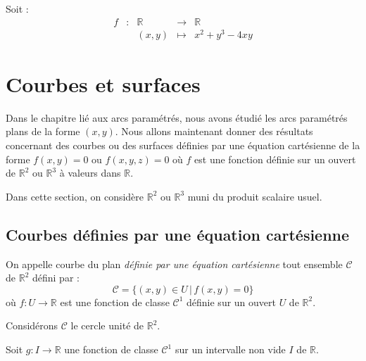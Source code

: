 \documentclass[a4paper,10pt]{report}
\begin{document}
\begin{ex} Soit :
$$\begin{array}{cccll}
f& : & \mathbb{R} & \rightarrow & \mathbb{R} \\
& & (x,y) & \mapsto & x^2+y^3-4xy 
\end{array}$$

\vspace{5cm}
\end{ex}

\section{Courbes et surfaces}
\noindent Dans le chapitre lié aux arcs paramétrés, nous avons étudié les arcs paramétrés plans de la forme $(x,y)$. Nous allons maintenant donner des résultats concernant des courbes ou des surfaces définies par une équation cartésienne de la forme $f(x,y)=0$ ou $f(x,y,z)=0$ où $f$ est une fonction définie sur un ouvert de $\mathbb{R}^2$ ou $\mathbb{R}^3$ à valeurs dans $\mathbb{R}$.

\medskip

\noindent Dans cette section, on considère $\mathbb{R}^2$ ou $\mathbb{R}^3$ muni du produit scalaire usuel.

\subsection{Courbes définies par une équation cartésienne}
\medskip

\noindent On appelle courbe du plan \textit{définie par une équation cartésienne} tout ensemble $\mathcal{C}$ de $\mathbb{R}^2$ défini par :
$$ \mathcal{C} = \lbrace (x,y) \in U \, \vert \, f(x,y)=0 \rbrace$$
où $f : U \rightarrow \mathbb{R}$ est une fonction de classe $\mathcal{C}^1$ définie sur un ouvert $U$ de $\mathbb{R}^2$.

\medskip

\begin{exems}
\item Considérons $\mathcal{C}$ le cercle unité de $\mathbb{R}^2$.

\vspace{5cm}
\item Soit $g : I \rightarrow \mathbb{R}$ une fonction de classe $\mathcal{C}^1$ sur un intervalle non vide $I$ de $\mathbb{R}$.

\vspace{5cm}
\end{exems}
\end{document}
